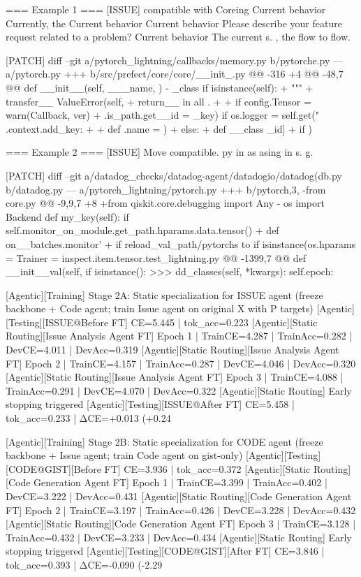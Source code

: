  === Example 1 ===
 [ISSUE]
 compatible with Coreing Current behavior Currently, the Current behavior Current behavior Please describe your feature request related to a problem? Current behavior The current s. , the flow to flow.
 
 [PATCH]
 diff --git a/pytorch_lightning/callbacks/memory.py b/pytorche.py --- a/pytorch.py +++ b/src/prefect/core/core/__init_.py @@ -316 +4 @@ -48,7 @@ def __init__(self, ___name, ) - _class if isinstance(self): + """ + transfer__ ValueError(self, + return__ in all . + + if config.Tensor = warn(Callback, ver) + .is_path.get__id = _key) if os.logger = self.get(" .context.add_key: + + def .name = ) + else: + def __class _id] + if )
 
 === Example 2 ===
 [ISSUE]
 Move compatible. py in as asing in s. g.
 
 [PATCH]
 diff --git a/datadog_checks/datadog-agent/datadogio/datadog(db.py b/datadog.py --- a/pytorch_lightning/pytorch.py +++ b/pytorch,3, -from core.py @@ -9,9,7 +8 +from qiskit.core.debugging import Any - os import Backend def my_key(self): if self.monitor_on_module.get_path.hparams.data.tensor() + def on__batches.monitor' + if reload_val_path/pytorchs to if isinstance(os.hparams = Trainer = inspect.item.tensor.test_lightning.py @@ -1399,7 @@ def __init__val(self, if isinstance(): >>> dd_classes(self, *kwargs): self.epoch:
 
 [Agentic][Training] Stage 2A: Static specialization for ISSUE agent (freeze backbone + Code agent; train Issue agent on original X with P targets)
 [Agentic][Testing][ISSUE@Before FT] CE=5.445 | tok_acc=0.223
 [Agentic][Static Routing][Issue Analysis Agent FT] Epoch 1 | TrainCE=4.287 | TrainAcc=0.282 | DevCE=4.011 | DevAcc=0.319
 [Agentic][Static Routing][Issue Analysis Agent FT] Epoch 2 | TrainCE=4.157 | TrainAcc=0.287 | DevCE=4.046 | DevAcc=0.320
 [Agentic][Static Routing][Issue Analysis Agent FT] Epoch 3 | TrainCE=4.088 | TrainAcc=0.291 | DevCE=4.070 | DevAcc=0.322
 [Agentic][Static Routing] Early stopping triggered
 [Agentic][Testing][ISSUE@After FT] CE=5.458 | tok_acc=0.233 | ΔCE=+0.013 (+0.24%
 
 [Agentic][Training] Stage 2B: Static specialization for CODE agent (freeze backbone + Issue agent; train Code agent on gist-only)
 [Agentic][Testing][CODE@GIST][Before FT] CE=3.936 | tok_acc=0.372
 [Agentic][Static Routing][Code Generation Agent FT] Epoch 1 | TrainCE=3.399 | TrainAcc=0.402 | DevCE=3.222 | DevAcc=0.431
 [Agentic][Static Routing][Code Generation Agent FT] Epoch 2 | TrainCE=3.197 | TrainAcc=0.426 | DevCE=3.228 | DevAcc=0.432
 [Agentic][Static Routing][Code Generation Agent FT] Epoch 3 | TrainCE=3.128 | TrainAcc=0.432 | DevCE=3.233 | DevAcc=0.434
 [Agentic][Static Routing] Early stopping triggered
 [Agentic][Testing][CODE@GIST][After FT] CE=3.846 | tok_acc=0.393 | ΔCE=-0.090 (-2.29%
 
